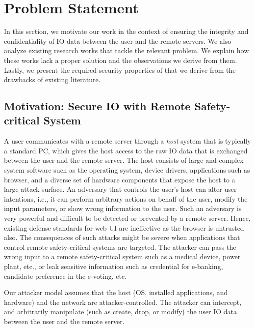 \section{Problem Statement}
\label{sec:problemStatement}

In this section, we motivate our work in the context of ensuring the integrity and confidentiality of IO data between the user and the remote servers. We also analyze existing research works that tackle the relevant problem. We explain how these works lack a proper solution and the observations we derive from them. Lastly, we present the required security properties of \name that we derive from the drawbacks of existing literature.

\subsection{Motivation: Secure IO with Remote Safety-critical System}

A user communicates with a remote server through a \emph{host} system that is typically a standard PC, which gives the host access to the raw IO data that is exchanged between the user and the remote server. The host consists of large and complex system software such as the operating system, device drivers, applications such as browser, and a diverse set of hardware components that expose the host to a large attack surface. An adversary that controls the user's host can alter user intentions, i.e., it can perform arbitrary actions on behalf of the user, modify the input parameters, or show wrong information to the user. Such an adversary is very powerful and difficult to be detected or prevented by a remote server. Hence, existing defense standards for web UI are ineffective as the browser is untrusted also. The consequences of such attacks might be severe when applications that control remote safety-critical systems are targeted. The attacker can pass the wrong input to a remote safety-critical system such as a medical device, power plant, etc., or leak sensitive information such as credential for e-banking, candidate preference in the e-voting, etc.

 Our attacker model assumes that the host (OS, installed applications, and hardware) and the network are attacker-controlled. The attacker can intercept, and arbitrarily manipulate (such as create, drop, or modify) the user IO data between the user and the remote server. 



